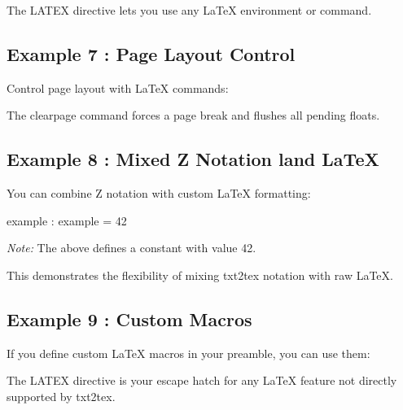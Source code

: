 \documentclass[a4paper,10pt,fleqn]{article}
\begin{document}
\noindent The LATEX directive lets you use any LaTeX environment or command.

\bigskip

\subsection*{Example 7 : Page Layout Control}

\noindent Control page layout with LaTeX commands:

\bigskip

\clearpage

\noindent The clearpage command forces a page break and flushes all pending floats.

\bigskip

\subsection*{Example 8 : Mixed Z Notation land LaTeX}

\noindent You can combine Z notation with custom LaTeX formatting:

\bigskip

\begin{axdef}
example : \nat
\where
example = 42
\end{axdef}

\medskip

\noindent\textit{Note:} The above defines a constant with value 42.

\noindent This demonstrates the flexibility of mixing txt2tex notation with raw LaTeX.

\bigskip

\subsection*{Example 9 : Custom Macros}

\noindent If you define custom LaTeX macros in your preamble, you can use them:

\bigskip




\noindent The LATEX directive is your escape hatch for any LaTeX feature not directly supported by txt2tex.

\bigskip
\end{document}
